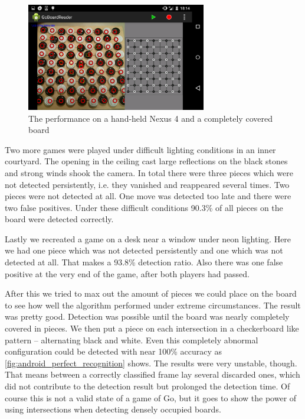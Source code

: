 	\begin{figure}[h!]
		\center
		\includegraphics[width=0.7\textwidth]{images/android_perfect_recognition.png}
		\caption{The performance on a hand-held Nexus 4 and a completely covered board}
		\label{fig:android_perfect_recognition}
	\end{figure}
	Two more games were played under difficult lighting conditions in an inner courtyard. The opening in the ceiling cast large reflections on the black stones and strong winds shook the camera. In total there were three pieces which were not detected persistently, i.e. they vanished and reappeared several times. Two pieces were not detected at all. One move was detected too late and there were two false positives. Under these difficult conditions 90.3\% of all pieces on the board were detected correctly.

	Lastly we recreated a game on a desk near a window under neon lighting. Here we had one piece which was not detected persistently and one which was not detected at all. That makes a 93.8\% detection ratio. Also there was one false positive at the very end of the game, after both players had passed.

	After this we tried to max out the amount of pieces we could place on the board to see how well the algorithm performed under extreme circumstances. The result was pretty good. Detection was possible until the board was nearly completely covered in pieces. We then put a piece on each intersection in a checkerboard like pattern -- alternating black and white. Even this completely abnormal configuration could be detected with near 100\% accuracy as \autoref{fig:android_perfect_recognition} shows. The results were very unstable, though. That means between a correctly classified frame lay several discarded ones, which did not contribute to the detection result but prolonged the detection time. Of course this is not a valid state of a game of Go, but it goes to show the power of using intersections when detecting densely occupied boards.
